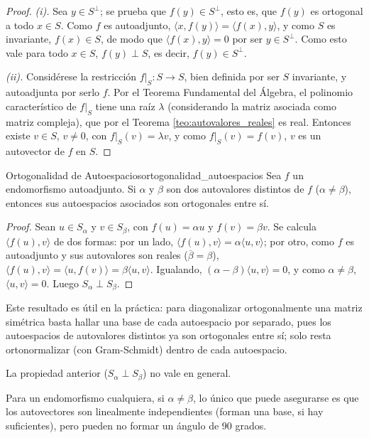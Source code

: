 \documentclass[11pt, a4paper]{article}
\begin{document}
\begin{proof}
\textit{(i).} Sea $y \in S^\perp$; se prueba que $f(y) \in S^\perp$, esto es, que $f(y)$ es ortogonal a todo $x \in S$. Como $f$ es autoadjunto, $\langle x, f(y) \rangle = \langle f(x), y \rangle$, y como $S$ es invariante, $f(x) \in S$, de modo que $\langle f(x), y \rangle = 0$ por ser $y \in S^\perp$. Como esto vale para todo $x \in S$, $f(y) \perp S$, es decir, $f(y) \in S^\perp$.

\textit{(ii).} Considérese la restricción $f|_S: S \to S$, bien definida por ser $S$ invariante, y autoadjunta por serlo $f$. Por el Teorema Fundamental del Álgebra, el polinomio característico de $f|_S$ tiene una raíz $\lambda$ (considerando la matriz asociada como matriz compleja), que por el Teorema \ref{teo:autovalores_reales} es real. Entonces existe $v \in S$, $v \neq 0$, con $f|_S(v) = \lambda v$, y como $f|_S(v) = f(v)$, $v$ es un autovector de $f$ en $S$.
\end{proof}

\begin{proposicion}{Ortogonalidad de Autoespacios}{ortogonalidad_autoespacios}
Sea $f$ un endomorfismo autoadjunto. Si $\alpha$ y $\beta$ son dos autovalores distintos de $f$ ($\alpha \neq \beta$), entonces sus autoespacios asociados son ortogonales entre sí.
\end{proposicion}

\begin{proof}
Sean $u \in S_\alpha$ y $v \in S_\beta$, con $f(u) = \alpha u$ y $f(v) = \beta v$. Se calcula $\langle f(u), v \rangle$ de dos formas: por un lado, $\langle f(u), v \rangle = \alpha \langle u, v \rangle$; por otro, como $f$ es autoadjunto y sus autovalores son reales ($\overline{\beta} = \beta$), $\langle f(u), v \rangle = \langle u, f(v) \rangle = \beta \langle u, v \rangle$. Igualando, $(\alpha - \beta) \langle u, v \rangle = 0$, y como $\alpha \neq \beta$, $\langle u, v \rangle = 0$. Luego $S_\alpha \perp S_\beta$.
\end{proof}

\obs Este resultado es útil en la práctica: para diagonalizar ortogonalmente una matriz simétrica basta hallar una base de cada autoespacio por separado, pues los autoespacios de autovalores distintos ya son ortogonales entre sí; solo resta ortonormalizar (con Gram-Schmidt) dentro de cada autoespacio.

\obs La propiedad anterior ($S_\alpha \perp S_\beta$) no vale en general.
    
    Para un endomorfismo cualquiera, si $\alpha \neq \beta$, lo único que puede asegurarse es que los autovectores son linealmente independientes (forman una base, si hay suficientes), pero pueden no formar un ángulo de 90 grados.
    
\end{document}
